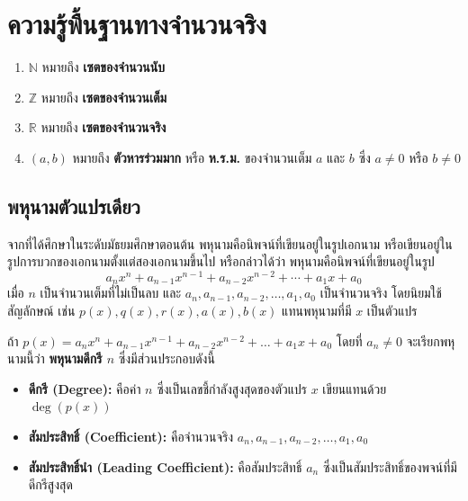 \chapter{ความรู้พื้นฐานทางจำนวนจริง}

\begin{agreementbox}
	\begin{enumerate}
		\item $\mathbb{N}$ หมายถึง \textbf{เซตของจำนวนนับ} 
		\item $\mathbb{Z}$ หมายถึง \textbf{เซตของจำนวนเต็ม}
		\item $\mathbb{R}$ หมายถึง \textbf{เซตของจำนวนจริง}
		\item $(a,b)$ หมายถึง \textbf{ตัวหารร่วมมาก} หรือ \textbf{ห.ร.ม.} ของจำนวนเต็ม $a$ และ $b$ ซึ่ง $a\neq 0$ หรือ $b\neq 0$
	\end{enumerate}   
\end{agreementbox}

\section{พหุนามตัวแปรเดียว}

จากที่ได้ศึกษาในระดับมัธยมศึกษาตอนต้น พหุนามคือนิพจน์ที่เขียนอยู่ในรูปเอกนาม หรือเขียนอยู่ในรูปการบวกของเอกนามตั้งแต่สองเอกนามขึ้นไป หรือกล่าวได้ว่า พหุนามคือนิพจน์ที่เขียนอยู่ในรูป
\begin{equation*}
	a_{n} x^{n} + a_{n-1} x^{n-1} + a_{n-2} x^{n-2} + \cdots + a_{1} x + a_{0}
\end{equation*}
เมื่อ $n$ เป็นจำนวนเต็มที่ไม่เป็นลบ และ $a_{n}, a_{n-1}, a_{n-2}, \ldots, a_{1}, a_{0}$ เป็นจำนวนจริง โดยนิยมใช้สัญลักษณ์ เช่น $p(x), q(x), r(x), a(x), b(x)$ แทนพหุนามที่มี $x$ เป็นตัวแปร

\begin{remarkbox}
	ถ้า $p(x) = a_{n}x^{n} + a_{n-1}x^{n-1} + a_{n-2}x^{n-2} + \dots + a_{1}x + a_{0}$ โดยที่ $a_{n} \neq 0$ จะเรียกพหุนามนี้ว่า \textbf{พหุนามดีกรี $n$} ซึ่งมีส่วนประกอบดังนี้
	\begin{itemize}
		\item \textbf{ดีกรี (Degree):} คือค่า $n$ ซึ่งเป็นเลขชี้กำลังสูงสุดของตัวแปร $x$ เขียนแทนด้วย $\operatorname{deg}(p(x))$
		\item \textbf{สัมประสิทธิ์ (Coefficient):} คือจำนวนจริง $a_{n}, a_{n-1}, a_{n-2}, \dots, a_{1}, a_{0}$
		\item \textbf{สัมประสิทธิ์นำ (Leading Coefficient):} คือสัมประสิทธิ์ $a_{n}$ ซึ่งเป็นสัมประสิทธิ์ของพจน์ที่มีดีกรีสูงสุด
	\end{itemize}
\end{remarkbox}

